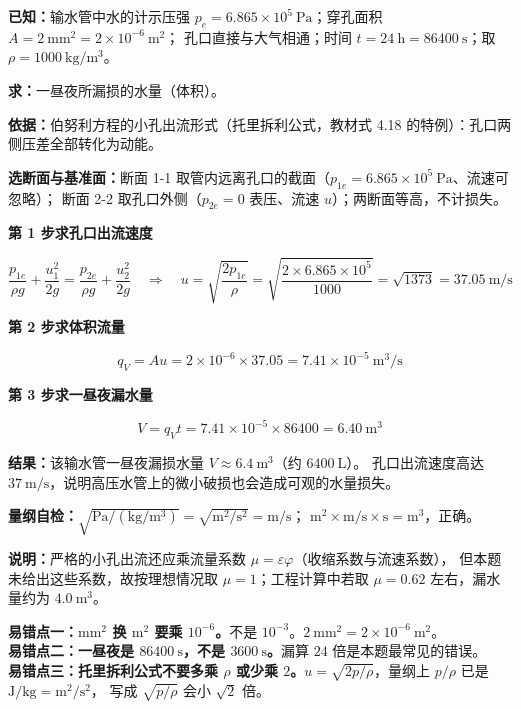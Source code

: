 \begin{jie}
\textbf{已知：}输水管中水的计示压强 $p_e=6.865\times10^5\ \mathrm{Pa}$；穿孔面积 $A=2\ \mathrm{mm^2}=2\times10^{-6}\ \mathrm{m^2}$；
孔口直接与大气相通；时间 $t=24\ \mathrm{h}=86400\ \mathrm{s}$；取 $\rho=1000\ \mathrm{kg/m^3}$。

\textbf{求：}一昼夜所漏损的水量（体积）。

\textbf{依据：}伯努利方程的小孔出流形式（托里拆利公式，教材式 4.18 的特例）：孔口两侧压差全部转化为动能。

\textbf{选断面与基准面：}断面 1-1 取管内远离孔口的截面（$p_{1e}=6.865\times10^5\ \mathrm{Pa}$、流速可忽略）；
断面 2-2 取孔口外侧（$p_{2e}=0$ 表压、流速 $u$）；两断面等高，不计损失。

\textbf{第 1 步\quad 求孔口出流速度}

\[ \frac{p_{1e}}{\rho g}+\frac{u_1^2}{2g}=\frac{p_{2e}}{\rho g}+\frac{u_2^2}{2g}
   \quad\Longrightarrow\quad
   u=\sqrt{\frac{2p_{1e}}{\rho}}=\sqrt{\frac{2\times6.865\times10^5}{1000}}=\sqrt{1373}=37.05\ \mathrm{m/s} \]

\textbf{第 2 步\quad 求体积流量}

\[ q_V=Au=2\times10^{-6}\times37.05=7.41\times10^{-5}\ \mathrm{m^3/s} \]

\textbf{第 3 步\quad 求一昼夜漏水量}

\[ V=q_Vt=7.41\times10^{-5}\times86400=6.40\ \mathrm{m^3} \]

\textbf{结果：}该输水管一昼夜漏损水量 $V\approx6.4\ \mathrm{m^3}$（约 $6400\ \mathrm{L}$）。
孔口出流速度高达 $37\ \mathrm{m/s}$，说明高压水管上的微小破损也会造成可观的水量损失。

\textbf{量纲自检：}$\sqrt{\mathrm{Pa/(kg/m^3)}}=\sqrt{\mathrm{m^2/s^2}}=\mathrm{m/s}$；
$\mathrm{m^2\times m/s\times s}=\mathrm{m^3}$，正确。

\textbf{说明：}严格的小孔出流还应乘流量系数 $\mu=\varepsilon\varphi$（收缩系数与流速系数），
但本题未给出这些系数，故按理想情况取 $\mu=1$；工程计算中若取 $\mu=0.62$ 左右，漏水量约为 $4.0\ \mathrm{m^3}$。
\end{jie}

\begin{yicuo}
\textbf{易错点一：$\mathrm{mm^2}$ 换 $\mathrm{m^2}$ 要乘 $10^{-6}$。}不是 $10^{-3}$。$2\ \mathrm{mm^2}=2\times10^{-6}\ \mathrm{m^2}$。\\
\textbf{易错点二：一昼夜是 $86400\ \mathrm{s}$，不是 $3600\ \mathrm{s}$。}漏算 $24$ 倍是本题最常见的错误。\\
\textbf{易错点三：托里拆利公式不要多乘 $\rho$ 或少乘 $2$。}$u=\sqrt{2p/\rho}$，量纲上 $p/\rho$ 已是 $\mathrm{J/kg}=\mathrm{m^2/s^2}$，
写成 $\sqrt{p/\rho}$ 会小 $\sqrt{2}$ 倍。
\end{yicuo}

